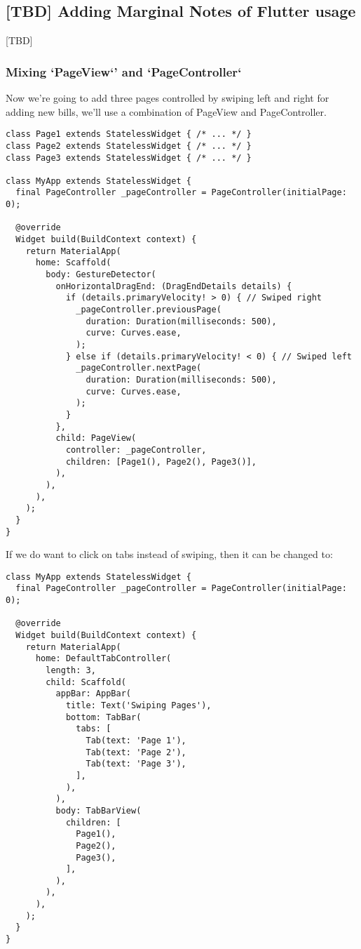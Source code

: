 
\subsection{[TBD] Adding Marginal Notes of Flutter usage}

[TBD]

\subsubsection{Mixing `PageView`' and `PageController`}

Now we're going to add three pages controlled by swiping left and right for adding new bills, we'll use a combination 
of PageView and PageController. 

\begin{lstlisting}
class Page1 extends StatelessWidget { /* ... */ }
class Page2 extends StatelessWidget { /* ... */ }
class Page3 extends StatelessWidget { /* ... */ }

class MyApp extends StatelessWidget {
  final PageController _pageController = PageController(initialPage: 0);

  @override
  Widget build(BuildContext context) {
    return MaterialApp(
      home: Scaffold(
        body: GestureDetector(
          onHorizontalDragEnd: (DragEndDetails details) {
            if (details.primaryVelocity! > 0) { // Swiped right
              _pageController.previousPage(
                duration: Duration(milliseconds: 500),
                curve: Curves.ease,
              );
            } else if (details.primaryVelocity! < 0) { // Swiped left
              _pageController.nextPage(
                duration: Duration(milliseconds: 500),
                curve: Curves.ease,
              );
            }
          },
          child: PageView(
            controller: _pageController,
            children: [Page1(), Page2(), Page3()],
          ),
        ),
      ),
    );
  }
}
\end{lstlisting}

If we do want to click on tabs instead of swiping, then it can be changed to:

\begin{lstlisting}
class MyApp extends StatelessWidget {
  final PageController _pageController = PageController(initialPage: 0);

  @override
  Widget build(BuildContext context) {
    return MaterialApp(
      home: DefaultTabController(
        length: 3,
        child: Scaffold(
          appBar: AppBar(
            title: Text('Swiping Pages'),
            bottom: TabBar(
              tabs: [
                Tab(text: 'Page 1'),
                Tab(text: 'Page 2'),
                Tab(text: 'Page 3'),
              ],
            ),
          ),
          body: TabBarView(
            children: [
              Page1(),
              Page2(),
              Page3(),
            ],
          ),
        ),
      ),
    );
  }
}
\end{lstlisting}

